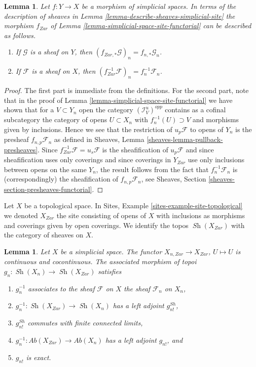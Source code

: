 \documentclass{stacks-project}
\theoremstyle{plain}
\newtheorem{lemma}[subsection]{Lemma}
\theoremstyle{definition}
\theoremstyle{remark}
\numberwithin{equation}{subsection}
\def\Sh{\mathop{\mathit{Sh}}\nolimits}
\begin{document}
\begin{lemma}
\label{lemma-describe-functoriality}
Let $f : Y \to X$ be a morphism of simplicial spaces. In terms of the
description of sheaves in
Lemma \ref{lemma-describe-sheaves-simplicial-site} the
morphism $f_{Zar}$ of Lemma \ref{lemma-simplicial-space-site-functorial}
can be described as follows.
\begin{enumerate}
\item If $\mathcal{G}$ is a sheaf on $Y$, then
$(f_{Zar, *}\mathcal{G})_n = f_{n, *}\mathcal{G}_n$.
\item If $\mathcal{F}$ is a sheaf on $X$, then
$(f_{Zar}^{-1}\mathcal{F})_n = f_n^{-1}\mathcal{F}_n$.
\end{enumerate}
\end{lemma}

\begin{proof}
The first part is immediate from the definitions. For the second part, note
that in the proof of
Lemma \ref{lemma-simplicial-space-site-functorial}
we have shown that for a $V \subset Y_n$ open the category
$(\mathcal{I}_V^u)^{opp}$ contains as a cofinal subcategory
the category of opens $U \subset X_n$ with $f_n^{-1}(U) \supset V$
and morphisms given by inclusions. Hence we see that the restriction
of $u_p\mathcal{F}$ to opens of $Y_n$ is the presheaf
$f_{n, p}\mathcal{F}_n$ as defined in
Sheaves, Lemma \ref{sheaves-lemma-pullback-presheaves}.
Since $f_{Zar}^{-1}\mathcal{F} = u_s\mathcal{F}$ is the sheafification
of $u_p\mathcal{F}$ and since sheafification uses only coverings and
since coverings in $Y_{Zar}$ use only inclusions between opens on the
same $Y_n$, the result follows from the fact that $f_n^{-1}\mathcal{F}_n$
is (correspondingly) the sheafification of $f_{n, p}\mathcal{F}_n$, see
Sheaves, Section \ref{sheaves-section-presheaves-functorial}.
\end{proof}

\noindent
Let $X$ be a topological space. In
Sites, Example \ref{sites-example-site-topological}
we denoted $X_{Zar}$ the site consisting of opens of $X$
with inclusions as morphisms and coverings given by open coverings.
We identify the topos $\Sh(X_{Zar})$ with the category
of sheaves on $X$.

\begin{lemma}
\label{lemma-restriction-to-components}
Let $X$ be a simplicial space. The functor
$X_{n, Zar} \to X_{Zar}$, $U \mapsto U$ is continuous
and cocontinuous. The associated morphism of
topoi $g_n : \Sh(X_n) \to \Sh(X_{Zar})$ satisfies
\begin{enumerate}
\item $g_n^{-1}$ associates to the sheaf $\mathcal{F}$ on $X$
the sheaf $\mathcal{F}_n$ on $X_n$,
\item $g_n^{-1} : \Sh(X_{Zar}) \to \Sh(X_n)$ has a left adjoint $g^{Sh}_{n!}$,
\item $g^{Sh}_{n!}$ commutes with finite connected limits,
\item $g_n^{-1} : \textit{Ab}(X_{Zar}) \to \textit{Ab}(X_n)$
has a left adjoint $g_{n!}$, and
\item $g_{n!}$ is exact.
\end{enumerate}
\end{lemma}
\end{document}
